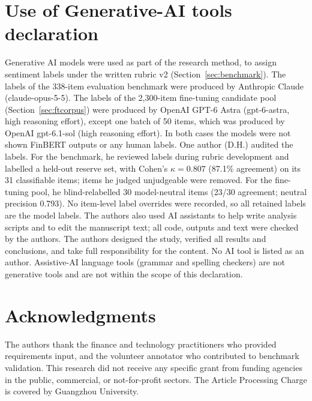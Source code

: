 \documentclass{aims}
\numberwithin{equation}{section}
\begin{document}
\section*{Use of Generative-AI tools declaration}
Generative AI models were used as part of the research method, to assign sentiment
labels under the written rubric v2 (Section~\ref{sec:benchmark}). The labels of the
338-item evaluation benchmark were produced by Anthropic Claude (claude-opus-5-5).
The labels of the 2{,}300-item fine-tuning candidate pool (Section~\ref{sec:ftcorpus})
were produced by OpenAI GPT-6 Astra (gpt-6-astra, high reasoning effort), except one
batch of 50 items, which was produced by OpenAI gpt-6.1-sol (high reasoning effort).
In both cases the models were not shown FinBERT outputs or any human labels. One author (D.H.) audited the labels. For the benchmark, he
reviewed labels during rubric development and labelled a held-out reserve set,
with Cohen's $\kappa = 0.807$ (87.1\% agreement) on its 31 classifiable items; items
he judged unjudgeable were removed. For the fine-tuning pool, he blind-relabelled
30 model-neutral items (23/30 agreement; neutral precision 0.793). No item-level
label overrides were recorded, so all retained labels are the model labels. The
authors also used AI assistants to help write analysis scripts and to edit the
manuscript text; all code, outputs and text were checked by the authors. The
authors designed the study, verified all results and conclusions, and take full
responsibility for the content. No AI tool is listed as an author. Assistive-AI
language tools (grammar and spelling checkers) are not generative tools and are not
within the scope of this declaration.

\section*{Acknowledgments}
The authors thank the finance and technology practitioners who provided
requirements input, and the volunteer annotator who contributed to benchmark
validation. This research did not receive any specific grant
from funding agencies in the public, commercial, or not-for-profit sectors. The
Article Processing Charge is covered by Guangzhou University.
\end{document}
